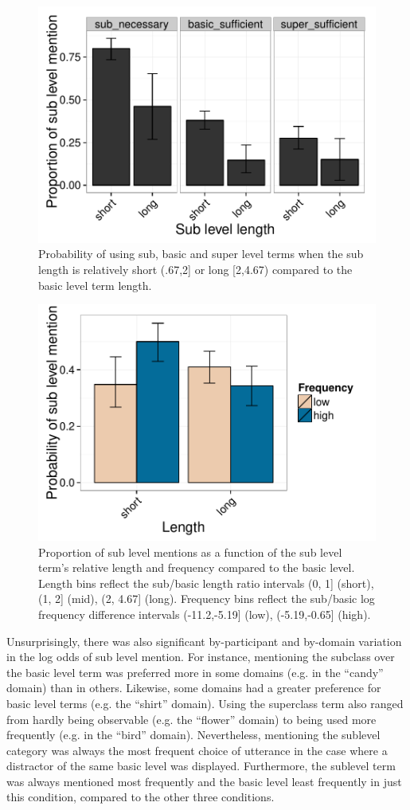 \documentclass[10pt,letterpaper]{article}
\newcommand{\figref}[1]{Figure \ref{#1}}
\begin{document}
\begin{figure}[ht!]
\centering
\includegraphics[width=.5\textwidth]{graphs/length-effect}
\caption{Probability of using sub, basic and super level terms when the sub  length is relatively short (.67,2] or long [2,4.67) compared to the basic level term length.}
 \label{fig:lengtheffect}
\end{figure}



\begin{figure}[ht!]
\centering
\includegraphics[width=.5\textwidth]{graphs/freq-length-interaction}
\caption{Proportion of sub level mentions  as a function of the sub level term's relative length and frequency compared to the basic level. Length bins reflect the sub/basic length ratio intervals (0, 1] (short), (1, 2] (mid), (2, 4.67] (long). Frequency bins reflect the sub/basic log frequency difference intervals (-11.2,-5.19] (low), (-5.19,-0.65] (high).}
\label{fig:lengthfreqinteraction}
\end{figure}


Unsurprisingly, there was also significant by-participant and by-domain variation in the log odds of sub level mention. %
For instance, mentioning the subclass over the basic level term was preferred more in some domains (e.g. in the ``candy'' domain) than in others. Likewise, some domains had a greater preference for basic level terms (e.g. the ``shirt'' domain). Using the superclass term also ranged from hardly being observable (e.g. the ``flower'' domain) to being used more frequently (e.g. in the ``bird'' domain). Nevertheless, mentioning the sublevel category was always the most frequent choice of utterance in the case where a distractor of the same basic level was displayed. Furthermore, the sublevel term was always mentioned most frequently and the basic level least frequently in just this condition, compared to the other three conditions.
\end{document}

